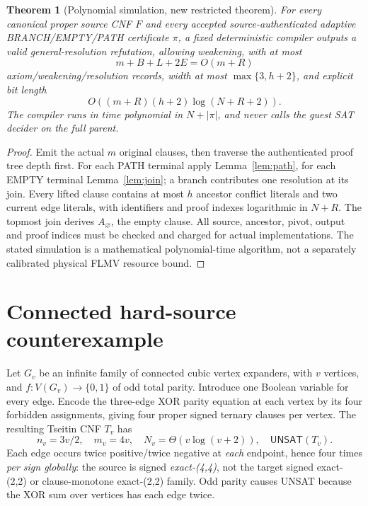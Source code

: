 \documentclass[11pt]{article}
\newtheorem{theorem}{Theorem}
\newcommand{\UNSAT}{\mathsf{UNSAT}}
\begin{document}
\begin{theorem}[Polynomial simulation, new restricted theorem]\label{th:sim}
For every canonical proper source CNF \(F\) and every accepted source-authenticated adaptive BRANCH/EMPTY/PATH certificate \(\pi\), a fixed deterministic compiler outputs a valid general-resolution refutation, allowing weakening, with at most
\[
m+B+L+2E=O(m+R)
\]
axiom/weakening/resolution records, width at most \(\max\{3,h+2\}\), and explicit bit length
\[
O((m+R)(h+2)\log(N+R+2)).
\]
The compiler runs in time polynomial in \(N+\lvert\pi\rvert\), and never calls the guest SAT decider on the full parent.
\end{theorem}
\begin{proof}
Emit the actual \(m\) original clauses, then traverse the authenticated proof tree depth first. For each PATH terminal apply Lemma~\ref{lem:path}, for each EMPTY terminal Lemma~\ref{lem:join}; a branch contributes one resolution at its join. Every lifted clause contains at most \(h\) ancestor conflict literals and two current edge literals, with identifiers and proof indexes logarithmic in \(N+R\). The topmost join derives \(A_\varnothing\), the empty clause. All source, ancestor, pivot, output and proof indices must be checked and charged for actual implementations. The stated simulation is a mathematical polynomial-time algorithm, not a separately calibrated physical FLMV resource bound.
\end{proof}

\section{Connected hard-source counterexample}
Let \(G_v\) be an infinite family of connected cubic vertex expanders, with \(v\) vertices, and \(f:V(G_v)\to\{0,1\}\) of odd total parity. Introduce one Boolean variable for every edge. Encode the three-edge XOR parity equation at each vertex by its four forbidden assignments, giving four proper signed ternary clauses per vertex. The resulting Tseitin CNF \(T_v\) has
\[
n_v=3v/2,\quad m_v=4v,\quad N_v=\Theta(v\log(v+2)),\quad \UNSAT(T_v).
\]
Each edge occurs twice positive/twice negative at \emph{each} endpoint, hence four times \emph{per sign globally}: the source is signed \emph{exact-(4,4)}, not the target signed exact-(2,2) or clause-monotone exact-(2,2) family. Odd parity causes UNSAT because the XOR sum over vertices has each edge twice.
\end{document}
